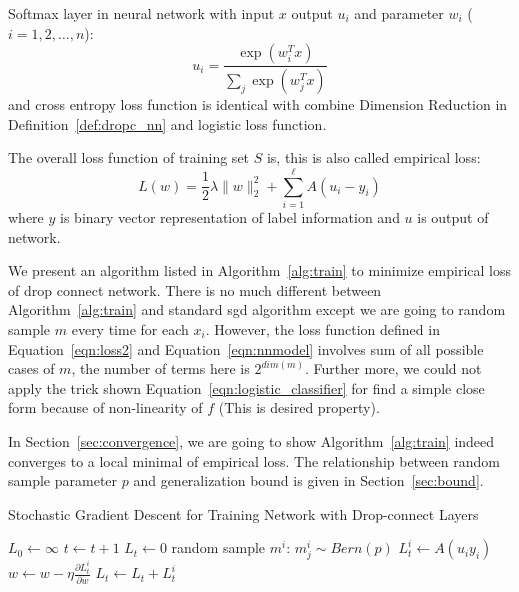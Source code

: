 \documentclass[9pt]{article}
\begin{document}
\begin{remark}
    Softmax layer in neural network with input $x$ output $u_i$ and parameter $w_i$ ($i=1,2,\ldots,n$):
    $$
    u_i = \frac{\exp{(w_i^Tx)}}{\sum_j \exp{(w_j^Tx)}}
    $$
    and cross entropy loss function is identical with combine Dimension Reduction in Definition~\ref{def:dropc_nn} 
    and logistic loss function.
\end{remark}

\begin{definition}
The overall loss function of training set $S$ is, this is also called empirical loss:
\begin{equation}
   \label{eqn:loss2}
   L(w) = \frac{1}{2}\lambda \|w\|^2_2 + \sum_{i=1}^\ell A( u_i-y_i )
\end{equation}
where $y$ is binary vector representation of label information and $u$ is output of network.
\end{definition}

We present an algorithm listed in Algorithm~\ref{alg:train} to minimize empirical loss
of drop connect network. There is no much different between Algorithm~\ref{alg:train}  
and standard sgd algorithm except we are 
going to random sample $m$ every time for each $x_i$. However, the loss function defined
in Equation~\ref{eqn:loss2} and Equation~\ref{eqn:nnmodel} involves sum of all possible
cases of $m$, the number of terms here is $2^{dim(m)}$. Further more, we could not
apply the trick shown Equation~\ref{eqn:logistic_classifier} for find a simple close form
because of non-linearity of $f$ (This is desired property). 

In Section~\ref{sec:convergence}, we are going to show
Algorithm~\ref{alg:train} indeed converges to a local minimal of empirical loss. 
The relationship between random sample parameter $p$ and generalization bound is given in
Section~\ref{sec:bound}.
\begin{algorithm}[ht]
   \label{alg:train}
   \caption{Stochastic Gradient Descent for Training Network with Drop-connect Layers}
   $L_0\leftarrow \infty$\;
   {
      $t\leftarrow t+1$\;
      $L_t\leftarrow 0$\;
       {
         random sample $m^i$: $m^i_j\sim Bern(p)$\;
         $L_t^i\leftarrow A( u_iy_i)$\;
         $w\leftarrow w - \eta \frac{\partial L_t^i}{\partial w}$\;
         $L_t\leftarrow L_t + L_t^i$\;
      }
   }
\end{algorithm}
\end{document}
